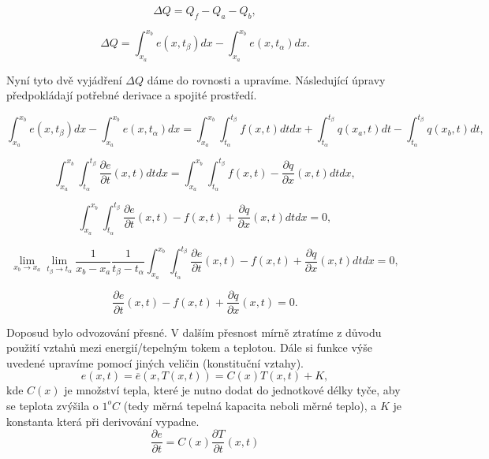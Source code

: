 \begin{equation}
\Delta Q = Q_f - Q_a -Q_b, 
\end{equation}

\begin{equation}
\Delta Q =\int_{x_a}^{x_b} e(x,t_\beta) dx    -\int_{x_a}^{x_b}  e(x,t_\alpha)dx. 
\end{equation}

Nyní tyto dvě vyjádření $\Delta Q$ dáme do rovnosti a upravíme. Následující úpravy předpokládají potřebné derivace a spojité prostředí.

\begin{equation}
\int_{x_a}^{x_b} e(x,t_\beta)dx-\int_{x_a}^{x_b}  e(x,t_\alpha)dx= \int_{x_a}^{x_b} \int_{t_\alpha}^{t_\beta} f(x,t) dt dx+\int_{t_\alpha}^{t_\beta} q(x_a,t) dt-\int_{t_\alpha}^{t_\beta} q(x_b,t) dt, 
\end{equation}

\begin{equation}
\int_{x_a}^{x_b} \int_{t_\alpha}^{t_\beta} \frac{\partial e}{\partial t} (x,t) dt
dx= \int_{x_a}^{x_b} \int_{t_\alpha}^{t_\beta} f(x,t)-\frac{\partial q}{\partial x} (x,t)dt dx,
\end{equation}

\begin{equation}
\int_{x_a}^{x_b} \int_{t_\alpha}^{t_\beta} \frac{\partial e}{\partial t}(x,t)-f(x,t)+\frac{\partial q}{\partial x} (x,t) dt dx=0 ,
\end{equation}

\begin{equation}
\lim_{x_b\rightarrow x_a} \lim_{t_\beta \rightarrow t_\alpha} \frac{1}{x_b-x_a}\frac{1}{t_\beta-t_\alpha}\int_{x_a}^{x_b} \int_{t_\alpha}^{t_\beta} \frac{\partial e}{\partial t}(x,t)-f(x,t)+\frac{\partial q}{\partial x} (x,t) dt
dx=0 ,
\end{equation}

\begin{equation}    
\frac{\partial e}{\partial t}(x,t)-f(x,t)+\frac{\partial q}{\partial x} (x,t)=0.\label{hxbwkuehbkuwhfcuwkbfwhck} \end{equation}

Doposud bylo odvozování přesné. V dalším přesnost mírně ztratíme z důvodu použití vztahů mezi energií/tepelným tokem a teplotou. 
Dále si funkce výše uvedené upravíme pomocí jiných veličin (konstituční vztahy).
\begin{equation}
e(x,t)=\overline{e}(x,T(x,t))=C(x)T(x,t)+K,
\end{equation}
kde $C(x)$ je množství tepla, které je nutno dodat do jednotkové délky tyče, aby se teplota zvýšila o $1^o C$ (tedy měrná tepelná kapacita neboli měrné teplo), a $K$ je konstanta která při derivování vypadne.
\begin{equation}
\frac{\partial e}{\partial t}=C(x) \frac{\partial T}{\partial t}(x,t)
\end{equation}

